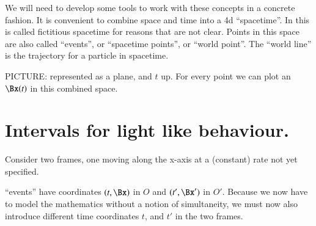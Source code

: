 %
%


We will need to develop some tools to work with these concepts in a concrete fashion.  It is convenient to combine space  and time  into a 4d ``spacetime''.  In \citep{landau1980classical} this is called fictitious spacetime for reasons that are not clear.  Points in this space are also called ``events'', or ``spacetime points'', or ``world point''.  The ``world line'' is the trajectory for a particle in spacetime.

PICTURE:  represented as a plane, and \(t\) up.  For every point we can plot an \(\Bx(t)\) in this combined space.
%
\section{Intervals for light like behaviour.}

Consider two frames, one moving along the x-axis at a (constant) rate not yet specified.

``events'' have coordinates \((t, \Bx)\) in \(O\) and \((t', \Bx')\) in \(O'\).  Because we now have to model the mathematics without a notion of simultaneity, we must now also introduce different time coordinates \(t\), and \(t'\) in the two frames.

